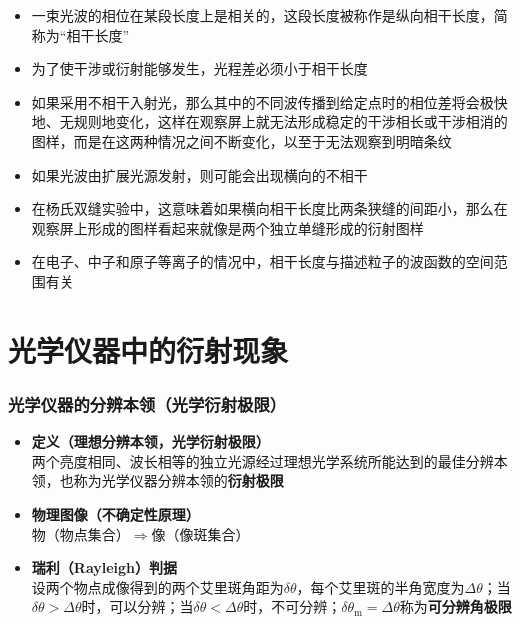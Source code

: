 \documentclass{beamer}
\newenvironment{slide}{
    \begin{frame}{\bfseries{\sectiontitle}}
}{
    \end{frame}
}
\newenvironment{itemlist}{
  \begin{itemize}
    \let\itemonly\item
    \renewcommand{\item}[1]{\itemonly \textbf{##1} \\}
    \setlength{\itemsep}{1em}
}{
  \end{itemize}
}
\let\sectiononly\section
\renewcommand{\section}[1]{
    \sectiononly{#1}
    \let\sectiontitle\relax
    \newcommand{\sectiontitle}{#1}
}
\begin{document}
\begin{slide}
    \begin{itemize}
        \item 一束光波的相位在某段长度上是相关的，这段长度被称作是纵向相干长度，简称为“相干长度”
        \item 为了使干涉或衍射能够发生，光程差必须小于相干长度
        \item 如果采用不相干入射光，那么其中的不同波传播到给定点时的相位差将会极快地、无规则地变化，这样在观察屏上就无法形成稳定的干涉相长或干涉相消的图样，而是在这两种情况之间不断变化，以至于无法观察到明暗条纹
        \item 如果光波由扩展光源发射，则可能会出现横向的不相干
        \item 在杨氏双缝实验中，这意味着如果横向相干长度比两条狭缝的间距小，那么在观察屏上形成的图样看起来就像是两个独立单缝形成的衍射图样
        \item 在电子、中子和原子等离子的情况中，相干长度与描述粒子的波函数的空间范围有关
    \end{itemize}
\end{slide}

\part{光学仪器中的衍射现象}

\begin{frame}
    \partpage
    \tableofcontents
\end{frame}

\section{光学仪器的分辨本领（光学衍射极限）}

\begin{slide}
  \begin{itemlist}
    \item{定义（理想分辨本领，光学衍射极限）}
      两个亮度相同、波长相等的独立光源经过理想光学系统所能达到的最佳分辨本领，也称为光学仪器分辨本领的\textbf{衍射极限}
    \item{物理图像（不确定性原理）}
      物（物点集合）$\Longrightarrow$像（像斑集合）
    \item{瑞利（Rayleigh）判据}
      设两个物点成像得到的两个艾里斑角距为$\delta\theta$，每个艾里斑的半角宽度为$\Delta\theta$；当$\delta\theta > \Delta\theta$时，可以分辨；当$\delta\theta < \Delta\theta$时，不可分辨；$\delta\theta_{\mathrm m} = \Delta\theta$称为\textbf{可分辨角极限}
  \end{itemlist}
\end{slide}
\end{document}
